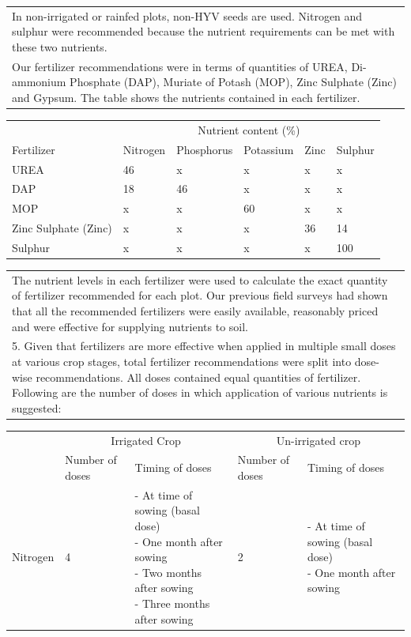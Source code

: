 \documentclass{article}
\begin{document}
\begin{table}[!htb]
\begin{tabularx}{\linewidth}{X}
In non-irrigated or rainfed plots, non-HYV seeds are used.  Nitrogen and sulphur were recommended because the nutrient requirements can be met with these two nutrients.\\
Our fertilizer recommendations were in terms of quantities of UREA, Di-ammonium Phosphate (DAP), Muriate of Potash (MOP), Zinc Sulphate (Zinc) and Gypsum. The table shows the nutrients contained in each fertilizer. \\ \hline 
\end{tabularx}
\begin{tabularx}{\linewidth}{lXXXXX}
 & \multicolumn{5}{c}{Nutrient content (\%)} \\
\cmidrule(l{2pt}r{2pt}){2-6} 
Fertilizer & Nitrogen & Phosphorus & Potassium & Zinc & Sulphur \\
UREA & 46 & x & x & x & x \\
DAP & 18 & 46 & x & x & x \\
MOP & x & x & 60 & x & x \\
Zinc Sulphate (Zinc) & x & x & x & 36 & 14 \\
Sulphur & x & x & x & x & 100\\
\end{tabularx}
\begin{tabularx}{\linewidth}{X}
\hline 
The nutrient levels in each fertilizer were used to calculate the exact quantity of fertilizer recommended for each plot. Our previous field surveys had shown that all the recommended fertilizers were easily available, reasonably priced and were effective for supplying nutrients to soil. \\
5. Given that fertilizers are more effective when applied in multiple small doses at various crop stages, total fertilizer recommendations were split into dose-wise recommendations. All doses contained equal quantities of fertilizer.  Following are the number of doses in which application of various nutrients is suggested: \\ \hline
\end{tabularx}
\begin{tabularx}{\linewidth}{llX|lX}
 & \multicolumn{2}{c}{Irrigated Crop} & \multicolumn{2}{c}{Un-irrigated crop} \\
\cmidrule(l{2pt}r{2pt}){2-3} \cmidrule(l{2pt}r{2pt}){4-5} 
 & Number of doses & Timing of doses & Number of doses & Timing of doses \\
Nitrogen & 4 & \makecell[l]{- At time of sowing (basal dose) \\ - One month after sowing \\ - Two months after sowing \\ - Three months after sowing} & 2 & \makecell[l]{- At time of sowing (basal dose) \\ - One month after sowing} \\

\end{tabularx}
\end{table}
\end{document}
